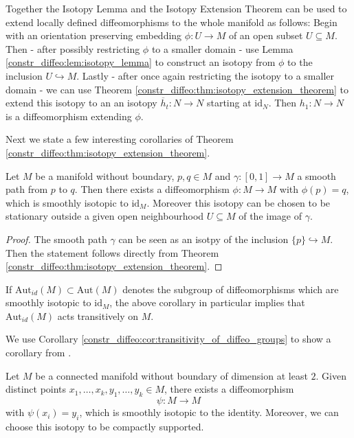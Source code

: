 Together the Isotopy Lemma and the Isotopy Extension Theorem can be used to extend locally defined diffeomorphisms to the whole manifold as follows: Begin with an orientation preserving embedding $\phi \colon U \to M$ of an open subset $U \subseteq M$. Then - after possibly restricting $\phi$ to a smaller domain - use Lemma \ref{constr_diffeo:lem:isotopy_lemma} to construct an isotopy from $\phi$ to the inclusion $U \hookrightarrow M$. Lastly - after once again restricting the isotopy to a smaller domain - we can use Theorem \ref{constr_diffeo:thm:isotopy_extension_theorem} to extend this isotopy to an an isotopy $\overline{h}_t \colon N \to N$ starting at $\mathrm{id}_N$. Then $h_1 \colon N \to N$ is a diffeomorphism extending $\phi$.

Next we state a few interesting corollaries of Theorem \ref{constr_diffeo:thm:isotopy_extension_theorem}.

\begin{corollary}
    \label{constr_diffeo:cor:transitivity_of_diffeo_groups}
    Let $M$ be a manifold without boundary, $p,q \in M$ and $\gamma \colon [0,1] \to M$ a smooth path from $p$ to $q$. Then there exists a diffeomorphism $\phi \colon M \to M$ with $\phi(p) = q$, which is smoothly isotopic to $\mathrm{id}_M$. Moreover this isotopy can be chosen to be stationary outside a given open neighbourhood $U \subseteq M$ of the image of $\gamma$.
\end{corollary}

\begin{proof}
    The smooth path $\gamma$ can be seen as an isotpy of the inclusion $\{p\} \hookrightarrow M$. Then the statement follows directly from Theorem \ref{constr_diffeo:thm:isotopy_extension_theorem}.
\end{proof}

\begin{remark}
    If $\mathrm{Aut}_{id}(M) \subset \mathrm{Aut}(M)$ denotes the subgroup of diffeomorphisms which are smoothly isotopic to $\mathrm{id}_M$, the above corollary in  particular implies that $\mathrm{Aut}_{id}(M)$ acts transitively on $M$.
\end{remark}

We use Corollary \ref{constr_diffeo:cor:transitivity_of_diffeo_groups} to show a corollary from \cite{guillemin2010differential}.

\begin{corollary}
    Let $M$ be a connected manifold without boundary of dimension at least $2$. Given distinct points $x_1,\ldots,x_k,y_1,\ldots,y_k \in M$, there exists a diffeomorphism
    \[
    \psi \colon M \to M
    \]
    with $\psi(x_i) = y_i$, which is smoothly isotopic to the identity. Moreover, we can choose this isotopy to be compactly supported.
\end{corollary}

